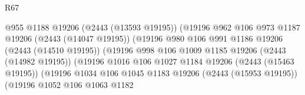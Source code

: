 \begin{lexlean}{R67}
\begin{coremodule}
                                              @955
                                              @1188
                                              @19206
                                              (@2443 (@13593 @19195))
                                              (@19196
                                                @962
                                                @106
                                                @973
                                                @1187
                                                @19206
                                                (@2443 (@14047 @19195))
                                                (@19196
                                                  @980
                                                  @106
                                                  @991
                                                  @1186
                                                  @19206
                                                  (@2443 (@14510 @19195))
                                                  (@19196
                                                    @998
                                                    @106
                                                    @1009
                                                    @1185
                                                    @19206
                                                    (@2443 (@14982 @19195))
                                                    (@19196
                                                      @1016
                                                      @106
                                                      @1027
                                                      @1184
                                                      @19206
                                                      (@2443 (@15463 @19195))
                                                      (@19196
                                                        @1034
                                                        @106
                                                        @1045
                                                        @1183
                                                        @19206
                                                        (@2443 (@15953 @19195))
                                                        (@19196
                                                          @1052
                                                          @106
                                                          @1063
                                                          @1182

\end{coremodule}
\end{lexlean}
